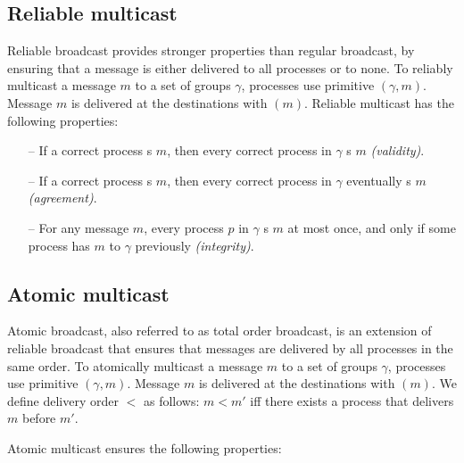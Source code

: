 \subsection{Reliable multicast}
\label{sec:rmcast}

Reliable broadcast provides stronger properties than regular broadcast, by
ensuring that a message is either delivered to all processes or to none. To
reliably multicast a message $m$ to a set of groups $\gamma$, processes use
primitive \rmcast$(\gamma, m)$.  Message $m$ is delivered at the destinations
with \rmdel$(m)$.  Reliable multicast has the following properties:

\begin{itemize}

    \item[--] If a correct process \rmcast{}s $m$, then every correct process in
      $\gamma$ \rmdel{}s $m$ \emph{(validity)}.

    \item[--] If a correct process \rmdel{}s $m$, then every correct process in
      $\gamma$ eventually \rmdel{}s $m$ \emph{(agreement)}.

    \item[--] For any message $m$, every process $p$ in $\gamma$ \rmdel{}s $m$
      at most once, and only if some process has \rmcast{} $m$ to $\gamma$
      previously \emph{(integrity)}.

\end{itemize}

\subsection{Atomic multicast}
\label{sec:amcast}
Atomic broadcast, also referred to as total order broadcast, is an extension of
reliable broadcast that ensures that messages are delivered by all processes in
the same order. To atomically multicast a message $m$ to a set of groups
$\gamma$, processes use primitive \amcast$(\gamma, m)$.  Message $m$ is
delivered at the destinations with \amdel$(m)$.  We define delivery order $<$ as
follows: $m < m'$ iff there exists a process that delivers $m$ before $m'$.

Atomic multicast ensures the following properties:

